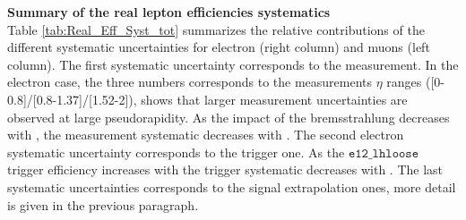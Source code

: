 		\par{\bf Summary of the real lepton efficiencies systematics \\}
		Table \ref{tab:Real_Eff_Syst_tot} summarizes the relative contributions of the different systematic uncertainties for electron (right column) and muons (left column). The first systematic uncertainty corresponds to the measurement. In the electron case, the three numbers corresponds to the measurements $\eta$ ranges ([0-0.8]/[0.8-1.37]/[1.52-2]), shows that larger measurement uncertainties are observed at large pseudorapidity. As the impact of the bremsstrahlung decreases with \pt, the measurement systematic decreases with \pt. The second electron systematic uncertainty corresponds to the trigger one. As the $\texttt{e12\_lhloose}$ trigger efficiency increases with \pt the trigger systematic decreases with \pt. The last systematic uncertainties corresponds to the signal extrapolation ones, more detail is given in the previous paragraph.

